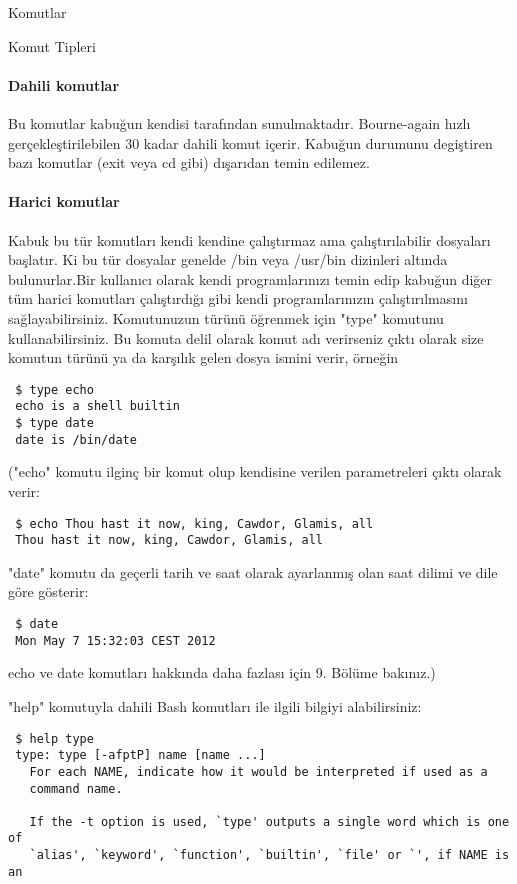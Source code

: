 \documentclass[10pt,a5paper]{book}
\begin{document}
\begin{section}{Komutlar}
\begin{subsection}{Komut Tipleri}
\paragraph{Dahili komutlar}{Bu komutlar kabuğun kendisi tarafından sunulmaktadır. Bourne-again hızlı gerçekleştirilebilen 30 kadar dahili komut içerir. Kabuğun durumunu degiştiren bazı komutlar (exit veya cd gibi) dışarıdan temin edilemez.}
\paragraph{Harici komutlar}{Kabuk bu tür komutları kendi kendine çalıştırmaz ama çalıştırılabilir dosyaları başlatır. Ki bu tür dosyalar genelde /bin veya /usr/bin dizinleri altında bulunurlar.Bir kullanıcı olarak kendi programlarınızı temin edip kabuğun diğer tüm harici komutları çalıştırdığı gibi kendi programlarınızın çalıştırılmasını sağlayabilirsiniz. Komutunuzun türünü öğrenmek için "type" komutunu kullanabilirsiniz. Bu komuta delil olarak komut adı verirseniz çıktı olarak size komutun türünü ya da karşılık gelen dosya ismini verir, örneğin}
\begin{verbatim}
 $ type echo
 echo is a shell builtin
 $ type date
 date is /bin/date
\end{verbatim}

("echo" komutu ilginç bir komut olup kendisine verilen parametreleri çıktı olarak verir:

\begin{verbatim}
 $ echo Thou hast it now, king, Cawdor, Glamis, all
 Thou hast it now, king, Cawdor, Glamis, all
\end{verbatim}

"date" komutu da geçerli tarih ve saat olarak ayarlanmış olan saat dilimi ve dile göre gösterir:

\begin{verbatim}
 $ date
 Mon May 7 15:32:03 CEST 2012
\end{verbatim}

echo ve date komutları hakkında daha fazlası için 9. Bölüme bakınız.)

"help" komutuyla dahili Bash komutları ile ilgili bilgiyi alabilirsiniz: 
\begin{verbatim}
 $ help type
 type: type [-afptP] name [name ...]
   For each NAME, indicate how it would be interpreted if used as a
   command name.
   
   If the -t option is used, `type' outputs a single word which is one of
   `alias', `keyword', `function', `builtin', `file' or `', if NAME is an
\end{verbatim}

\end{subsection}
\end{section}
\end{document}
